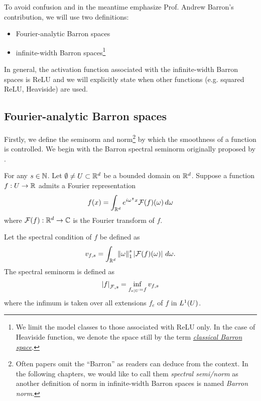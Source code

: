 To avoid confusion and in the meantime emphasize Prof. Andrew Barron's
contribution, we will use two definitions:
\begin{itemize}
    \item Fourier-analytic Barron spaces
    \item infinite-width Barron spaces\footnote{
        We limit the model classes to those associated with ReLU only. In the 
        case of Heaviside function, we denote the space still by the term 
        \hyperref[def:heaviside_space]{\textit{classical Barron space}}.
    }
\end{itemize}

In general, the activation function associated with the infinite-width Barron
spaces is ReLU and we will explicitly state when other functions (e.g. squared
ReLU, Heaviside) are used.


\subsection{Fourier-analytic Barron spaces}

Firstly, we define the seminorm and norm\footnote{
    Often papers omit the ``Barron'' as readers can deduce from the context. 
    In the following chapters, we would like to call them \textit{spectral 
    semi/norm} as another definition of norm in infinite-width Barron spaces is 
    named \textit{Barron norm}.
} by which the smoothness of a function
is controlled. We begin with the Barron spectral seminorm originally proposed
 by \cite{barronUniversalApproximationBounds1993}.


\begin{definition}
    \label{def:spectral_seminorm}
    For any $s \in \mathbb{N}$. Let $\emptyset \not= U \subset \mathbb{R}^d$ be a bounded
    domain on $\mathbb{R}^d$. Suppose a function $f: U \to \mathbb{R}$ admits a Fourier
    representation
    \begin{equation}
        f(x) = \int_{\mathbb{R}^d} e^{i\omega{}^{\intercal} x} \mathcal{F}(f)(\omega) \,d\omega
    \end{equation}
    where $\mathcal{F}(f): \mathbb{R}^d \to \mathbb{C}$ is the Fourier transform of $f$.

    Let the spectral condition of $f$ be defined as
    \begin{equation}
        \label{eq:spectral_condition}
        v_{f,s} 
            = \int_{\mathbb{R}^d} \left\| \omega \right\|_1^s \left| \mathcal{F}(f)(\omega) \right|\,d\omega.
    \end{equation}
    The spectral seminorm is defined as
    \begin{equation}
        \left| f \right|_{\mathcal{F}, {s}} = \inf_{f_{e\mid U} = f} v_{f,s}
    \end{equation}
    where the infimum is taken over all extensions $f_e$ of $f$ in $L^{1}(U)$.
\end{definition}

